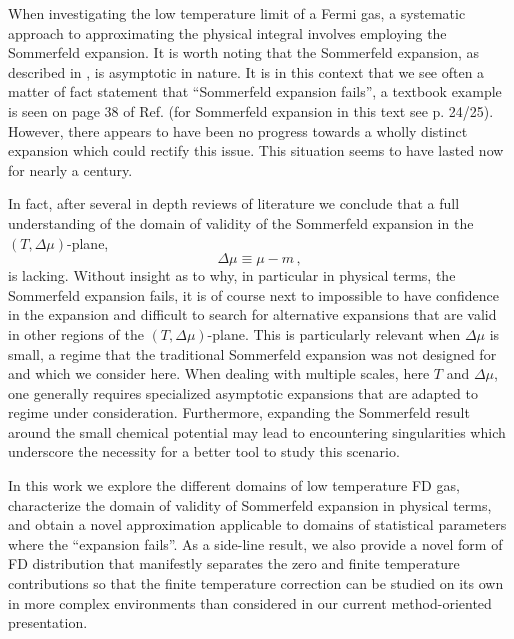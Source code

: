 \documentclass[sn-mathphys,Numbered]{sn-jnl}
\begin{document}
When investigating the low temperature limit of a Fermi gas, a systematic approach to approximating the physical integral involves employing the Sommerfeld expansion. It is worth noting that the Sommerfeld expansion, as described in \cite{landau2013statistical}, is asymptotic in nature. It is in this context that we see often a matter of fact statement that ``Sommerfeld expansion fails'', a  textbook example is seen on page 38 of Ref.\cite{Kuebler:2021Th}   (for Sommerfeld expansion in this text see p. 24/25). However, there appears to have been no progress towards a wholly distinct expansion which could rectify this issue. This situation seems to have lasted now for  nearly a century. 


In fact, after several in depth reviews of literature we conclude that a full understanding of the domain of validity of the Sommerfeld expansion in the $(T,\Delta\mu)$-plane,
\begin{equation}\label{DeltaMu}
\Delta\mu\equiv \mu-m\,,
\end{equation}
is lacking. Without insight as to why, in particular in physical terms, the Sommerfeld expansion fails, it is of course next to impossible to have confidence  in the expansion and difficult to search for alternative expansions that are valid in other regions of the $(T,\Delta\mu)$-plane.  This is particularly relevant when $\Delta\mu$ is small, a regime that the traditional Sommerfeld expansion was not designed for and which we consider here. When dealing with multiple scales, here $T$ and $\Delta\mu$, one generally requires specialized asymptotic expansions that are adapted to regime under consideration. Furthermore, expanding the Sommerfeld result around the small chemical potential may lead to encountering singularities which underscore the necessity for a better tool to study this scenario. 

In this work we explore the different domains of low temperature FD gas, characterize the domain of validity of Sommerfeld expansion in physical terms, and obtain a novel approximation applicable to domains of statistical parameters where the ``expansion fails''.  As a side-line result, we also provide a novel form of FD distribution that manifestly separates the zero and finite temperature contributions so that the finite temperature correction can be studied on its own in more complex environments than considered in our current method-oriented presentation.  
 
\end{document}
